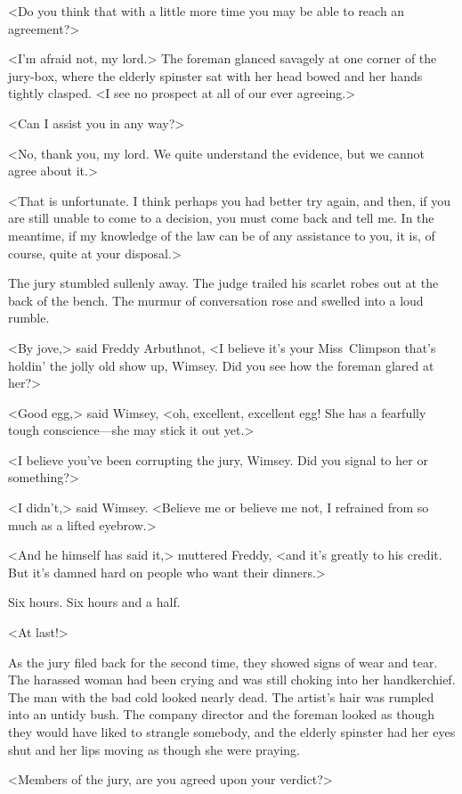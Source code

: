 <Do you think that with a little more time you may be able to reach an agreement?>

<I'm afraid not, my lord.> The foreman glanced savagely at one corner of the jury-box, where the elderly spinster sat with her head bowed and her hands tightly clasped. <I see no prospect at all of our ever agreeing.>

<Can I assist you in any way?>

<No, thank you, my lord. We quite understand the evidence, but we cannot agree about it.>

<That is unfortunate. I think perhaps you had better try again, and then, if you are still unable to come to a decision, you must come back and tell me. In the meantime, if my knowledge of the law can be of any assistance to you, it is, of course, quite at your disposal.>

The jury stumbled sullenly away. The judge trailed his scarlet robes out at the back of the bench. The murmur of conversation rose and swelled into a loud rumble.

<By jove,> said Freddy Arbuthnot, <I believe it's your Miss~Climpson that's holdin' the jolly old show up, Wimsey. Did you see how the foreman glared at her?>

<Good egg,> said Wimsey, <oh, excellent, excellent egg! She has a fearfully tough conscience—she may stick it out yet.>

<I believe you've been corrupting the jury, Wimsey. Did you signal to her or something?>

<I didn't,> said Wimsey. <Believe me or believe me not, I refrained from so much as a lifted eyebrow.>

<And he himself has said it,> muttered Freddy, <and it's greatly to his credit. But it's damned hard on people who want their dinners.>

Six hours. Six hours and a half.

<At last!>

As the jury filed back for the second time, they showed signs of wear and tear. The harassed woman had been crying and was still choking into her handkerchief. The man with the bad cold looked nearly dead. The artist's hair was rumpled into an untidy bush. The company director and the foreman looked as though they would have liked to strangle somebody, and the elderly spinster had her eyes shut and her lips moving as though she were praying.

<Members of the jury, are you agreed upon your verdict?>

